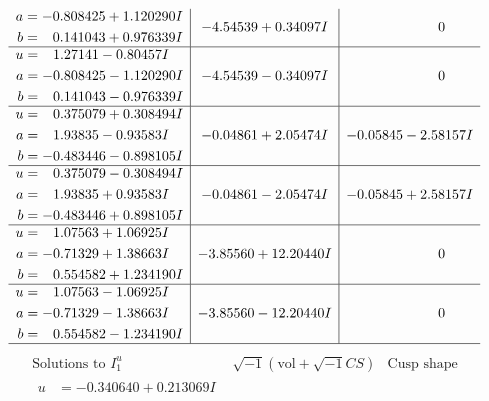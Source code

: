 \documentclass[1p]{elsarticle_modified}
\theoremstyle{definition}
\newcommand{\I}{\sqrt{-1}}
\begin{document}
$$\begin{array}{c|c|c}
\begin{aligned}
a &= -0.808425 + 1.120290 I \\
b &= \phantom{-}0.141043 + 0.976339 I\end{aligned}
 & -4.54539 + 0.34097 I & \phantom{-0.000000 } 0 \\ \hline\begin{aligned}
u &= \phantom{-}1.27141 - 0.80457 I \\
a &= -0.808425 - 1.120290 I \\
b &= \phantom{-}0.141043 - 0.976339 I\end{aligned}
 & -4.54539 - 0.34097 I & \phantom{-0.000000 } 0 \\ \hline\begin{aligned}
u &= \phantom{-}0.375079 + 0.308494 I \\
a &= \phantom{-}1.93835 - 0.93583 I \\
b &= -0.483446 - 0.898105 I\end{aligned}
 & -0.04861 + 2.05474 I & -0.05845 - 2.58157 I \\ \hline\begin{aligned}
u &= \phantom{-}0.375079 - 0.308494 I \\
a &= \phantom{-}1.93835 + 0.93583 I \\
b &= -0.483446 + 0.898105 I\end{aligned}
 & -0.04861 - 2.05474 I & -0.05845 + 2.58157 I \\ \hline\begin{aligned}
u &= \phantom{-}1.07563 + 1.06925 I \\
a &= -0.71329 + 1.38663 I \\
b &= \phantom{-}0.554582 + 1.234190 I\end{aligned}
 & -3.85560 + 12.20440 I & \phantom{-0.000000 } 0 \\ \hline\begin{aligned}
u &= \phantom{-}1.07563 - 1.06925 I \\
a &= -0.71329 - 1.38663 I \\
b &= \phantom{-}0.554582 - 1.234190 I\end{aligned}
 & -3.85560 - 12.20440 I & \phantom{-0.000000 } 0\\
 \hline 
 \end{array}$$\newpage$$\begin{array}{c|c|c}  
\text{Solutions to }I^u_{1}& \I (\text{vol} + \sqrt{-1}CS) & \text{Cusp shape}\\
 \hline 
\begin{aligned}
u &= -0.340640 + 0.213069 I \\

\end{aligned}
\end{array}$$
\end{document}

